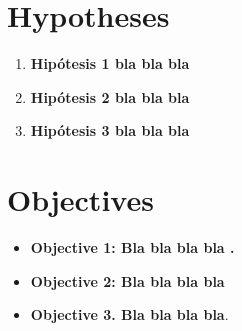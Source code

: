 
\section{Hypotheses}

\lipsum[1-1]


\begin{enumerate}[label=(\alph*)]

 \item  \textbf{Hipótesis 1 bla bla bla}

 \item \textbf{Hipótesis 2  bla bla bla}

 \item \textbf{Hipótesis 3  bla bla bla}

\end{enumerate}


\newpage


\section{Objectives}

\lipsum[1-1]

\begin{itemize}

\item \textbf{Objective 1: Bla bla bla bla .}  

\lipsum[1-1]

 \item \textbf{Objective 2: Bla bla bla bla}  
 
\lipsum[1-1]

\item \textbf{Objective 3. Bla bla bla bla}. 

\lipsum[1-1]


\end{itemize}



